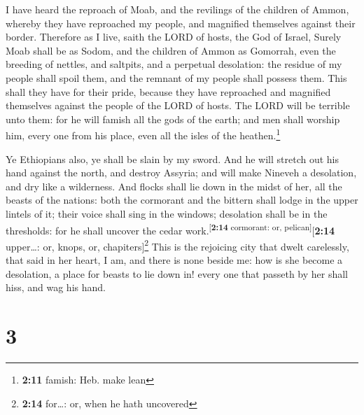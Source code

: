  I have heard the reproach of Moab, and the revilings of
the children of Ammon, whereby they have reproached my people, and
magnified themselves against their border.  Therefore as I
live, saith the LORD of hosts, the God of Israel, Surely Moab shall be
as Sodom, and the children of Ammon as Gomorrah, even the breeding of
nettles, and saltpits, and a perpetual desolation: the residue of my
people shall spoil them, and the remnant of my people shall possess
them.  This shall they have for their pride, because they
have reproached and magnified themselves against the people of the LORD
of hosts.  The LORD will be terrible unto them: for he
will famish all the gods of the earth; and men shall worship him, every
one from his place, even all the isles of the heathen.\footnote{\textbf{2:11}
  famish: Heb. make lean}

 Ye Ethiopians also, ye shall be slain by my sword.
 And he will stretch out his hand against the north, and
destroy Assyria; and will make Nineveh a desolation, and dry like a
wilderness.  And flocks shall lie down in the midst of
her, all the beasts of the nations: both the cormorant and the bittern
shall lodge in the upper lintels of it; their voice shall sing in the
windows; desolation shall be in the thresholds: for he shall uncover the
cedar work.\textsuperscript{{[}\textbf{2:14} cormorant: or,
pelican{]}}{[}\textbf{2:14} upper\ldots: or, knops, or,
chapiters{]}\footnote{\textbf{2:14} for\ldots: or, when he hath
  uncovered}  This is the rejoicing city that dwelt
carelessly, that said in her heart, I am, and there is none beside me:
how is she become a desolation, a place for beasts to lie down in! every
one that passeth by her shall hiss, and wag his hand.

\hypertarget{section-2}{%
\section{3}\label{section-2}}


